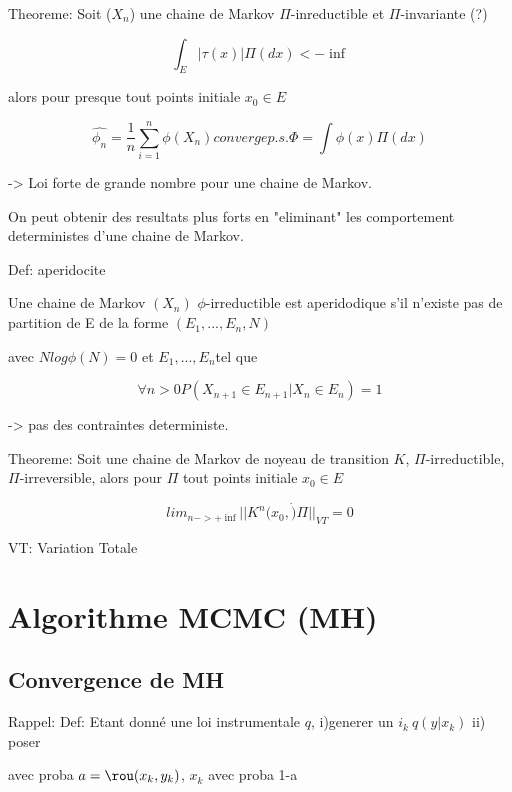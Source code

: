 \documentclass{article}
\begin{document}
Theoreme: Soit ($X_n$) une chaine de Markov $\Pi$-inreductible et $\Pi$-invariante (?)


\begin{equation}
\int_E |\tau(x)|\Pi(dx)<-\inf
\end{equation}

alors pour presque tout points initiale $x_0\in E$


\begin{equation}
\hat{\phi_n}=\frac{1}{n}\sum_{i=1}^{n}\phi(X_n) converge p.s. \Phi=\int \phi(x)\Pi(dx)
\end{equation}

-> Loi forte de grande nombre pour une chaine de Markov.

On peut obtenir des resultats plus forts en "eliminant" les comportement deterministes d'une chaine de Markov.

Def: aperidocite

Une chaine de Markov $(X_n)$ $\phi$-irreductible est aperidodique s'il n'existe pas de partition de E de la forme $(E_1,...,E_n,N)$

avec $Nlog\phi(N)=0$ et $E_1,...,E_n$tel que

\begin{equation}
\forall n>0 P(X_{n+1}\in E_{n+1}|X_n\in E_n) = 1
\end{equation}

-> pas des contraintes deterministe.

Theoreme: Soit une chaine de Markov de noyeau de transition $K$, $\Pi$-irreductible, $\Pi$-irreversible, alors pour $\Pi$ tout points initiale $x_0 \in E$

\begin{equation}
lim_{n->+\inf} ||K^n (x_0, \dot)\Pi||_{VT}=0
\end{equation}

VT: Variation Totale

\section{Algorithme MCMC (MH)}
\subsection{Convergence de MH}
Rappel:
Def: Etant donn\'e une loi instrumentale $q$, 
i)generer un $i_k~q(y|x_k)$
ii) poser

\begin{equation}

\end{equation} 
avec proba $a=\rou(x_k,y_k)$, $x_k$ avec proba 1-a
\end{document}
